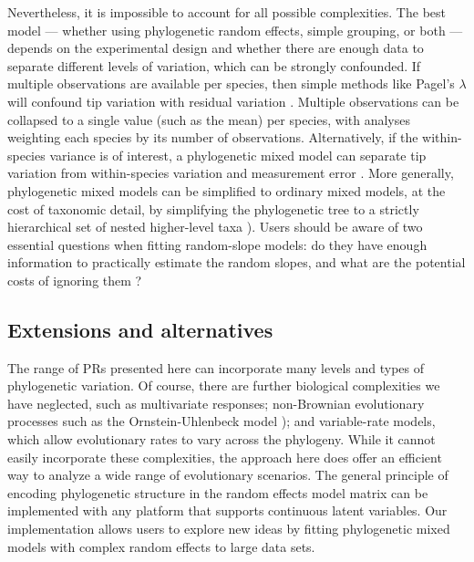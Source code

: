 \documentclass[12pt]{article}
\begin{document}
Nevertheless, it is impossible to account for all possible complexities.
The best model --- whether using phylogenetic random effects, simple grouping, or both --- depends on the experimental design and whether there are enough data to separate different levels of variation, which can be strongly confounded.
If multiple observations are available per species, then simple methods like Pagel's $\lambda$ will confound tip variation with residual variation \citep{boettiger2013is}.
Multiple observations can be collapsed to a single value (such as the mean) per species, with analyses weighting each species by its number of observations.
Alternatively, if the within-species variance is of interest, a phylogenetic mixed model can separate tip variation from within-species variation and measurement error \citep{kostikova2016bridging}.
More generally, phylogenetic mixed models can be simplified to ordinary mixed models, at the cost of taxonomic detail, by simplifying the phylogenetic tree to a strictly hierarchical set of nested higher-level taxa \citep{bunnefeld2012island}). 
Users should be aware of two essential questions when fitting random-slope models: do they have enough information to practically estimate the random slopes, and what are the potential costs of ignoring them \citep{schielzeth2008conclusions}? 

\subsection*{Extensions and alternatives}

The range of PRs presented here can incorporate many levels and types of phylogenetic variation.
Of course, there are further biological complexities we have neglected, such as multivariate responses; non-Brownian evolutionary processes such as the Ornstein-Uhlenbeck model \citep{butler2004phylogenetic}); and variable-rate models, which allow evolutionary rates to vary across the phylogeny.
While it cannot easily incorporate these complexities, the approach here does offer an efficient way to analyze a wide range of evolutionary scenarios.
The general principle of encoding phylogenetic structure in the random effects model matrix can be implemented with any platform that supports continuous latent variables.
Our implementation allows users to explore new ideas by fitting phylogenetic mixed models with complex random effects to large data sets.
\end{document}
